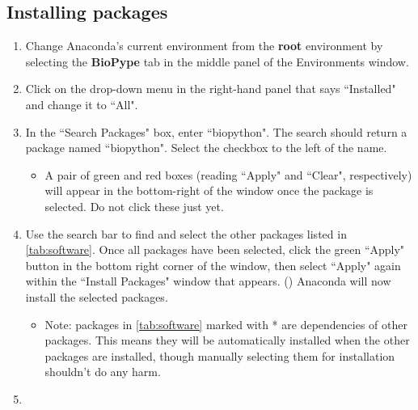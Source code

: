 \subsection{Installing packages}
    \begin{enumerate}
        \item Change Anaconda's current environment from the \textbf{root} environment by selecting the \textbf{BioPype} tab in the middle panel of the Environments window.
        \item Click on the drop-down menu in the right-hand panel that says ``Installed" and change it to ``All".
        \item In the ``Search Packages" box, enter ``biopython". The search should return a package named ``biopython". Select the checkbox to the left of the name.  
        \begin{itemize}
            \item A pair of green and red boxes (reading ``Apply" and ``Clear", respectively) will appear in the bottom-right of the window once the package is selected. Do not click these just yet. 
        \end{itemize}
        \item Use the search bar to find and select the other packages listed in \autoref{tab:software}. Once all packages have been selected, click the green ``Apply" button in the bottom right corner of the window, then select ``Apply" again within the ``Install Packages" window that appears. () Anaconda will now install the selected packages.
        \begin{itemize}
            \item Note: packages in \autoref{tab:software} marked with * are dependencies of other packages. This means they will be automatically installed when the other packages are installed, though manually selecting them for installation shouldn't do any harm.
        \end{itemize}
        \item {}

\end{enumerate}

